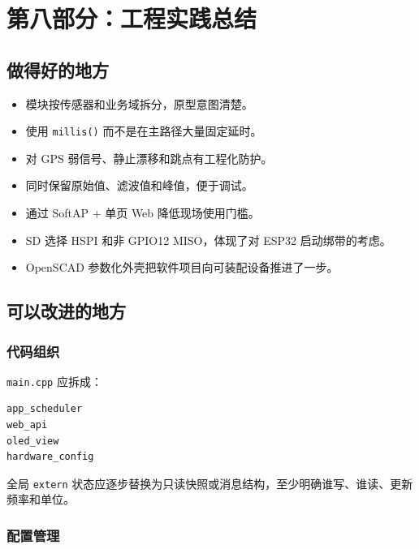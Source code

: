 \documentclass[
  UTF8,11pt,a4paper]{ctexart}
\newcommand{\passthrough}[1]{#1}
\providecommand{\tightlist}{%
  \setlength{\itemsep}{0pt}\setlength{\parskip}{0pt}}
\begin{document}
\section{第八部分：工程实践总结}\label{ux7b2cux516bux90e8ux5206ux5de5ux7a0bux5b9eux8df5ux603bux7ed3}

\subsection{做得好的地方}\label{ux505aux5f97ux597dux7684ux5730ux65b9}

\begin{itemize}
\tightlist
\item
  模块按传感器和业务域拆分，原型意图清楚。
\item
  使用 \passthrough{\lstinline!millis()!} 而不是在主路径大量固定延时。
\item
  对 GPS 弱信号、静止漂移和跳点有工程化防护。
\item
  同时保留原始值、滤波值和峰值，便于调试。
\item
  通过 SoftAP + 单页 Web 降低现场使用门槛。
\item
  SD 选择 HSPI 和非 GPIO12 MISO，体现了对 ESP32 启动绑带的考虑。
\item
  OpenSCAD 参数化外壳把软件项目向可装配设备推进了一步。
\end{itemize}

\subsection{可以改进的地方}\label{ux53efux4ee5ux6539ux8fdbux7684ux5730ux65b9}

\subsubsection{代码组织}\label{ux4ee3ux7801ux7ec4ux7ec7}

\passthrough{\lstinline!main.cpp!} 应拆成：

\begin{lstlisting}
app_scheduler
web_api
oled_view
hardware_config
\end{lstlisting}

全局 \passthrough{\lstinline!extern!}
状态应逐步替换为只读快照或消息结构，至少明确谁写、谁读、更新频率和单位。

\subsubsection{配置管理}\label{ux914dux7f6eux7ba1ux7406}
\end{document}
